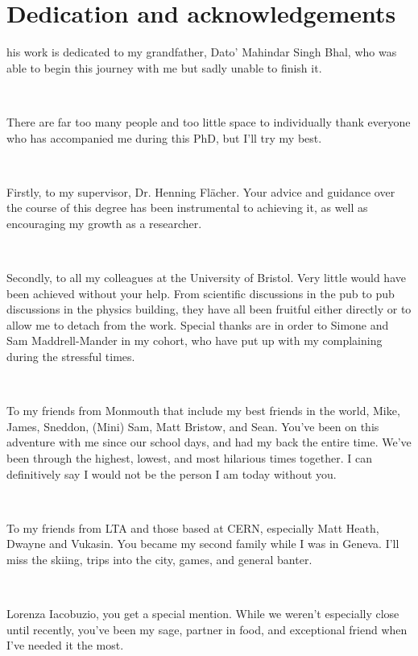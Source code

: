 %
%

\chapter*{Dedication and acknowledgements}
\begin{SingleSpace}
his work is dedicated to my grandfather, Dato' Mahindar Singh Bhal, who was able to begin this journey with me but sadly unable to finish it.

\

There are far too many people and too little space to individually thank everyone who has accompanied me during this PhD, but I'll try my best.

\

Firstly, to my supervisor, Dr. Henning Fl\"{a}cher. Your advice and guidance over the course of this degree has been instrumental to achieving it, as well as encouraging my growth as a researcher.

\

Secondly, to all my colleagues at the University of Bristol. Very little would have been achieved without your help. From scientific discussions in the pub to pub discussions in the physics building, they have all been fruitful either directly or to allow me to detach from the work. Special thanks are in order to Simone and Sam Maddrell-Mander in my cohort, who have put up with my complaining during the stressful times.

\

To my friends from Monmouth that include my best friends in the world, Mike, James, Sneddon, (Mini) Sam, Matt Bristow, and Sean. You've been on this adventure with me since our school days, and had my back the entire time. We've been through the highest, lowest, and most hilarious times together. I can definitively say I would not be the person I am today without you.

\

To my friends from LTA and those based at CERN, especially Matt Heath, Dwayne and Vukasin. You became my second family while I was in Geneva. I'll miss the skiing, trips into the city, games, and general banter.

\

Lorenza Iacobuzio, you get a special mention. While we weren't especially close until recently, you've been my sage, partner in food, and exceptional friend when I've needed it the most.

\end{SingleSpace}
\clearpage

